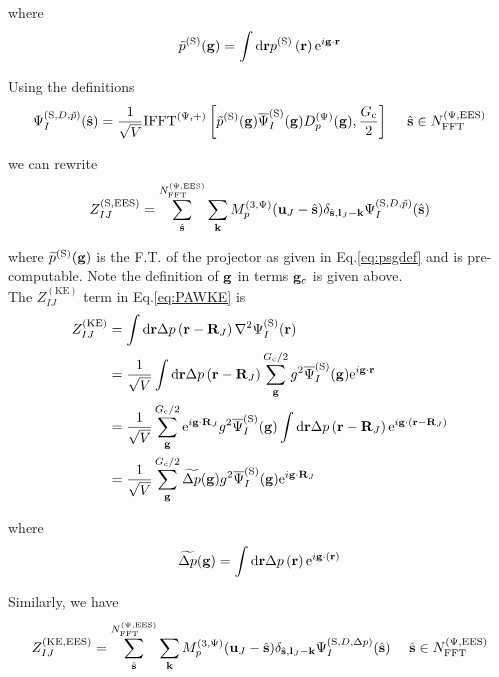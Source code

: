 \documentclass[paper=a4, fontsize=11pt]{article} %
\numberwithin{equation}{section} %
\numberwithin{figure}{section} %
\numberwithin{table}{section} %
\newcommand{\wt}{\widetilde}
\newcommand{\bu}{{\bf{u}}}
\newcommand{\bl}{{\bf{l}}}
\newcommand{\bk}{{\bf{k}}}
\newcommand{\bs}{{\bf{s}}}
\newcommand{\bg}{{\bf{g}}}
\newcommand{\br}{{\bf{r}}}
\newcommand{\bR}{{\bf{R}}}
\newcommand{\hs}{{\hat{\bf{s}}}}
\newcommand{\rS}{{\mathrm{S}}}
\newcommand{\rKE}{{\mathrm{KE}}}
\newcommand{\rEES}{{\mathrm{EES}}}
\newcommand{\re}{{\mathrm{e}}}
\newcommand{\rd}{{\mathrm{d}}}
\newcommand{\ibgR}{i\bg\cdot\bR}
\newcommand{\ibgr}{i\bg\cdot\br}
\newcommand{\psigs}{{\overline \Psi_I^{(\rS)}(\bg)}}
\newcommand{\NFFTpEES}{{N^{\mathrm{(\Psi,\rEES})}_{\mathrm{FFT}}}}
\newcommand{\Gc}{{G_{\mathrm{c}}}}
\newcommand{\hGc}{{\frac{G_{\mathrm{c}}}{2}}}
\newcommand{\Dpg}{{D^{(\Psi)}_p(\bg)}}
\newcommand{\Mp}{{M_p^{(3,\Psi)}}}
\newcommand{\IFFTp}{{\mathrm{IFFT}^{(\Psi,+)}}}
\newcommand{\hsinpEES}{{\ \ \ \ \hs \in \NFFTpEES}}
\begin{document}
where 
\begin{equation}\label{eq:psgdef}
\tilde p^{(\rS)} (\bg) = \int \rd\br  p^{(\rS)}\left( \br\right)\re^{ i \bg\cdot \br}
\end{equation}


Using the definitions
\begin{equation}
\begin{split}
\Psi_I^{(\rS,D,\tilde p)}(\hs)
&= \frac{1}{\sqrt{V}}\IFFTp \left[ \tilde p^{(\rS)}(\bg)\psigs \Dpg,\hGc\right]\hsinpEES \\
\end{split}
\end{equation}

we can rewrite
\begin{equation}
\begin{split}
Z_{IJ}^{(\rS,\rEES)}& = \sum_{\hat \bs}^{\NFFTpEES}  \sum_{\bk} \Mp(\bu_{J}-\hat \bs)\delta_{\hat \bs,\bl_J-\bk} \Psi_I^{(\rS,D,\tilde p)}(\hs)\\
\end{split}
\end{equation}

where $\wt {p}^{(\rS)} (\bg)$ is the F.T. of the projector as given in Eq.\eqref{eq:psgdef} and is pre-computable. Note the definition of $\bg$ in terms $\bg_c$ is given above.\\

The $Z_{IJ}^{(\rKE)}$ term in Eq.\eqref{eq:PAWKE} is
\begin{equation} \label{eq:ZKEpre}
\begin{split}
Z_{IJ}^{(\rKE)}
&=\int \rd\br\Delta p\left( \br-\bR_J \right)\nabla^2\Psi_I^{(\rS)}(\br)\\
 & = \frac{1}{\sqrt{V}}\int \rd\br\Delta p\left( \br-\bR_J \right)\sum_\bg^{\Gc/2} g^2 \psigs  \re^{\ibgr} \\
 & = \frac{1}{\sqrt{V}}\sum_\bg^{\Gc/2} \re^{\ibgR_J} g^2 \psigs  \int \rd\br\Delta p\left( \br-\bR_J \right) \re^{ i \bg\cdot(\br-\bR_J)} \\
 & = \frac{1}{\sqrt{V}}\sum_\bg^{\Gc/2} \wt{\Delta p} (\bg) g^2 \psigs  \re^{\ibgR_J} 
\end{split}
\end{equation}

where
\begin{equation}
\widetilde {\Delta p} (\bg) = \int \rd\br  \Delta p\left( \br\right)\re^{ i \bg\cdot(\br)}
\end{equation}


Similarly, we have
\begin{equation}
\begin{split}
Z_{IJ}^{(\rKE,\rEES)}
& = \sum_{\hat \bs}^{\NFFTpEES}  \sum_{\bk} \Mp(\bu_{J}-\hat \bs)\delta_{\hat \bs,\bl_J-\bk} \Psi_I^{(\rS,D,\Delta p)}(\hs) \hsinpEES\\
\end{split}
\end{equation}
\end{document}

